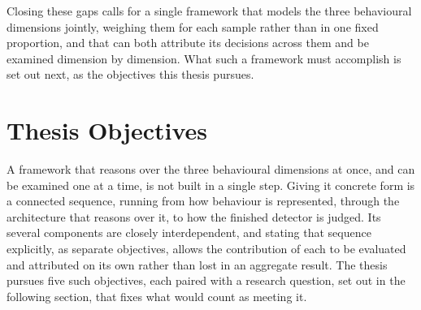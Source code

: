 \documentclass[%
    BCOR=10mm,
    DIV=13,
    toc=bibliography,
    toc=listof,
    oneside,
    12pt,
]{scrbook}
\begin{document}
Closing these gaps calls for a single framework that models the three behavioural
dimensions jointly, weighing them for each sample rather than in one fixed
proportion, and that can both attribute its decisions across them and be
examined dimension by dimension. What such a framework must accomplish is set out
next, as the objectives this thesis pursues.

\endgroup

\section{Thesis Objectives}
\label{sec:objectives}

A framework that reasons over the three behavioural dimensions at once, and
can be examined one at a time, is not built in a single step. Giving it
concrete form is a connected sequence, running from how behaviour is
represented, through the architecture that reasons over it, to how the
finished detector is judged. Its several components are closely
interdependent, and stating that sequence explicitly, as separate objectives,
allows the contribution of each to be evaluated and attributed on its own
rather than lost in an aggregate result. The thesis pursues five such
objectives, each paired with a research question, set out in the following
section, that fixes what would count as meeting it.
\end{document}
